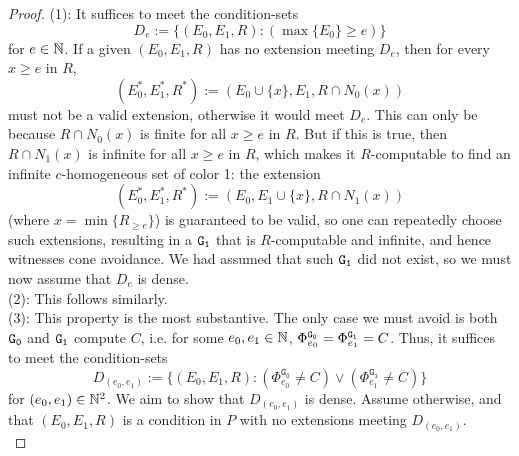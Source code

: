 \documentclass{amsart}
\begin{document}
\begin{proof}
		(1): It suffices to meet the condition-sets
		$$
		D_e := \{(E_0,E_1,R) : (\max\{E_0\}\geq e)\}
		$$
		for $e\in \mathbb{N}$. If a given $(E_0,E_1,R)$ has no extension meeting $D_e$, then for every $x\geq e$ in $R$,
		$$
		(E_0^*,E_1^*,R^*) := (E_0 \cup \{x\},E_1,R \cap N_0(x))
		$$
		must not be a valid extension, otherwise it would meet $D_e$. This can only be because $R\cap N_0(x)$ is finite for all $x \geq e$ in $R$. But if this is true, then $R\cap N_1(x)$ is infinite for all $x\geq e$ in $R$, which makes it $R$-computable to find an infinite $c$-homogeneous set of color 1: the extension
		$$
		(E_0^*,E_1^*,R^*) := (E_0,E_1 \cup \{x\},R\cap N_1(x))
		$$
		(where $x = \min \{R_{\geq e}\}$) is guaranteed to be valid, so one can repeatedly choose such extensions, resulting in a $\tt{G_1}$ that is $R$-computable and infinite, and hence witnesses cone avoidance. We had assumed that such $\tt{G_1}$ did not exist, so we must now assume that $D_e$ is dense. \\
		
		(2): This follows similarly.
		\\
		
		(3): This property is the most substantive. The only case we must avoid is both $\tt{G_0}$ and $\tt{G_1}$ compute $C$, i.e. for some $e_0,e_1\in \mathbb{N}$, $\Phi^{\tt{G_0}}_{e_0}=\Phi^{\tt{G_1}}_{e_1}=C$. Thus, it suffices to meet the condition-sets
		$$
		D_{(e_0,e_1)} := \{(E_0,E_1,R): (\Phi_{e_0}^{\mathtt{G_0}}\neq C) \vee (\Phi_{e_1}^{\mathtt{G_1}}\neq C) \}
		$$
		for $(e_0,e_1)\in \mathbb{N}^2$. We aim to show that $D_{(e_0,e_1)}$ is dense. Assume otherwise, and that $(E_0,E_1,R)$ is a condition in $P$ with no extensions meeting $D_{(e_0,e_1)}$.\\
		
		
		

\end{proof}
\end{document}
